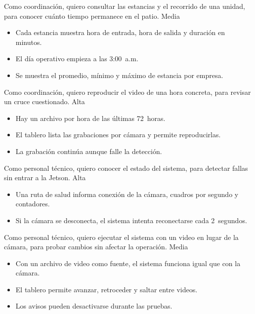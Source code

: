   {Como coordinación, quiero consultar las estancias y el recorrido de una
   unidad, para conocer cuánto tiempo permanece en el patio.}
  {Media}
  {\begin{itemize}[nosep,leftmargin=*]
     \item Cada estancia muestra hora de entrada, hora de salida y
           duración en minutos.
     \item El día operativo empieza a las 3:00~a.m.
     \item Se muestra el promedio, mínimo y máximo de estancia por
           empresa.
   \end{itemize}}

  {Como coordinación, quiero reproducir el video de una hora concreta,
   para revisar un cruce cuestionado.}
  {Alta}
  {\begin{itemize}[nosep,leftmargin=*]
     \item Hay un archivo por hora de las últimas 72~horas.
     \item El tablero lista las grabaciones por cámara y permite
           reproducirlas.
     \item La grabación continúa aunque falle la detección.
   \end{itemize}}

  {Como personal técnico, quiero conocer el estado del sistema, para
   detectar fallas sin entrar a la Jetson.}
  {Alta}
  {\begin{itemize}[nosep,leftmargin=*]
     \item Una ruta de salud informa conexión de la cámara, cuadros por
           segundo y contadores.
     \item Si la cámara se desconecta, el sistema intenta reconectarse cada
           2~segundos.
   \end{itemize}}

  {Como personal técnico, quiero ejecutar el sistema con un video en lugar
   de la cámara, para probar cambios sin afectar la operación.}
  {Media}
  {\begin{itemize}[nosep,leftmargin=*]
     \item Con un archivo de video como fuente, el sistema funciona igual
           que con la cámara.
     \item El tablero permite avanzar, retroceder y saltar entre videos.
     \item Los avisos pueden desactivarse durante las pruebas.
   \end{itemize}}

